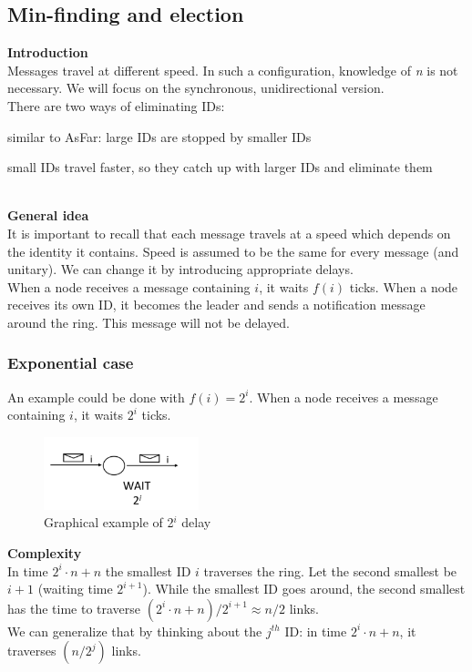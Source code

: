 \documentclass[paper=a4, fontsize=11pt]{scrartcl} %
\numberwithin{equation}{section} %
\numberwithin{figure}{section} %
\numberwithin{table}{section} %
\begin{document}
\subsection*{Min-finding and election}
\textbf{Introduction}\\
Messages travel at different speed. In such a configuration, knowledge of \textit{n} is not necessary. We will focus on the synchronous, unidirectional version.\\
There are two ways of eliminating IDs: 
\begin{compactenum}
	\item similar to AsFar: large IDs are stopped by smaller IDs
	\item small IDs travel faster, so they catch up with larger IDs and eliminate them
\end{compactenum}
~ \\ 
\textbf{General idea}\\
It is important to recall that each message travels at a speed which depends on the identity it contains.
Speed is assumed to be the same for every message (and unitary). We can change it by introducing appropriate delays.\\
When a node receives a message containing $i$, it waits $f(i)$ ticks. When a node receives its own ID, it becomes the leader and sends a notification message around the ring. This message will not be delayed.

\subsubsection*{Exponential case}
An example could be done with $f(i) = 2^i$. When a node receives a message containing $i$, it waits $2^i$ ticks. 
\begin{figure}[H]
  \centering
  \includegraphics[width=0.4\textwidth]{img/fi.png}
  \caption{Graphical example of 2$^i$ delay}
  
\end{figure}

\textbf{Complexity} \\ 
In time $2^i\cdot n + n$ the smallest ID $i$ traverses the ring. Let the second smallest be $i+1$ (waiting time $2^{i+1}$). While the smallest ID goes around, the second smallest has the time to traverse $(2^i\cdot n + n)/ 2^{i+1} \approx n/2$ links.\\
We can generalize that by thinking about the $j^{th}$ ID: in time $2^i\cdot n + n$, it traverses $(n/2^j)$ links.
\end{document}
